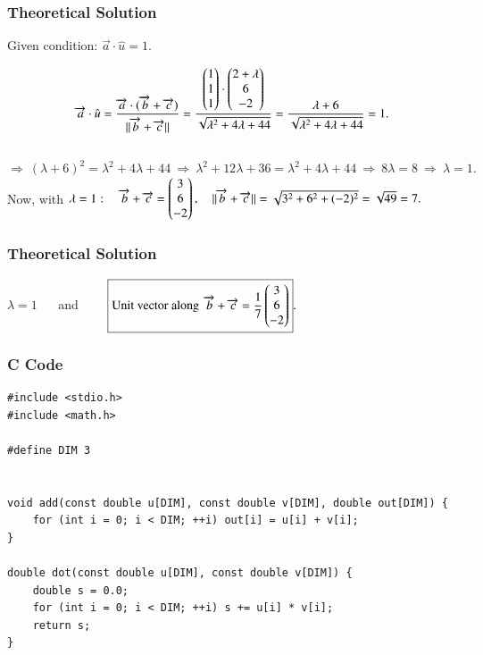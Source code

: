 \documentclass{beamer}
\begin{document}
\begin{frame}[fragile]
    \frametitle{Theoretical Solution}
    Given condition: $\overrightarrow{a}\cdot \hat{u}=1.$  

$$ \overrightarrow{a}\cdot\hat{u} = \dfrac{\overrightarrow{a}\cdot(\overrightarrow{b}+\overrightarrow{c})}{\|\overrightarrow{b}+\overrightarrow{c}\|}
= \dfrac{\begin{pmatrix}1\\1\\1\end{pmatrix}\cdot\begin{pmatrix}2+\lambda\\6\\-2\end{pmatrix}}
{\sqrt{\lambda^2+4\lambda+44}}
= \dfrac{\lambda+6}{\sqrt{\lambda^2+4\lambda+44}}=1.
$$ \\


$
\Rightarrow\ (\lambda+6)^2=\lambda^2+4\lambda+44
\ \Longrightarrow\ 
\lambda^2+12\lambda+36=\lambda^2+4\lambda+44
\ \Longrightarrow\ 
8\lambda=8\ \Longrightarrow\ 
\boxed{\lambda=1}.$ \\

Now, with $\lambda=1:\quad \overrightarrow{b}+\overrightarrow{c}
=\begin{pmatrix}3\\6\\-2\end{pmatrix},\quad \|\overrightarrow{b}+\overrightarrow{c}\|
=\sqrt{3^2+6^2+(-2)^2} = \sqrt{49} = 7.$ \\
\end{frame}


\begin{frame}[fragile]
    \frametitle{Theoretical Solution}

$\boxed{\lambda=1}$ $\quad$ and $\qquad 
\boxed{\text{Unit vector along }\,\overrightarrow{b}+\overrightarrow{c}
=\dfrac{1}{7}\begin{pmatrix}3\\6\\-2\end{pmatrix}}.$
\end{frame}


\begin{frame}[fragile]
    \frametitle{C Code}
    \begin{lstlisting}
#include <stdio.h>
#include <math.h>

#define DIM 3


void add(const double u[DIM], const double v[DIM], double out[DIM]) {
    for (int i = 0; i < DIM; ++i) out[i] = u[i] + v[i];
}

double dot(const double u[DIM], const double v[DIM]) {
    double s = 0.0;
    for (int i = 0; i < DIM; ++i) s += u[i] * v[i];
    return s;
}
    \end{lstlisting}
\end{frame}
\end{document}
